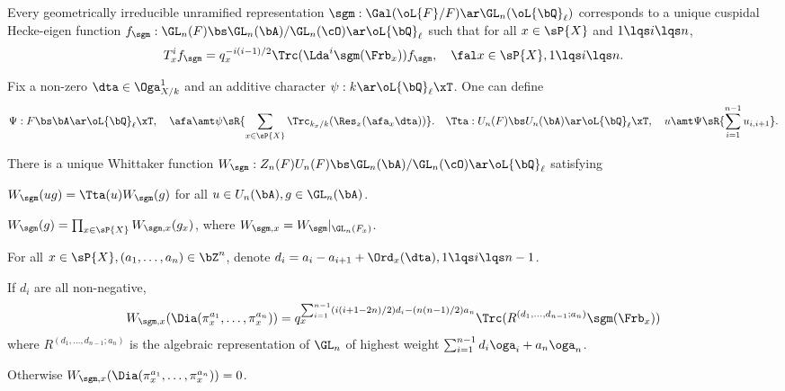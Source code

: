\documentclass[a4paper, twoside]{article}
\begin{document}
\confighead{}{}{}



\begin{cnj}
	Every geometrically irreducible unramified representation $\sgm:\Gal(\oL{F}/F)\ar\GL_{n}(\oL{\bQ}_{\ell})$
	corresponds to a unique cuspidal Hecke-eigen function $f_{\sgm}:\GL_{n}(F)\bs\GL_{n}(\bA)/\GL_{n}(\cO)\ar\oL{\bQ}_{\ell}$ such that for all $x\in\sP{X}$ and $1\lqs i\lqs n$,
	\[
		T_{x}^{i}f_{\sgm}=q_{x}^{-i(i-1)/2}\Trc(\Lda^{i}\sgm(\Frb_{x}))f_{\sgm},\quad \fal x\in\sP{X}, 1\lqs i\lqs n.
	\]
\end{cnj}

\begin{thm}
	Fix a non-zero $\dta\in\Oga_{X/k}^{1}$ and an additive character $\psi:k\ar\oL{\bQ}_{\ell}\xT$. One can define
	\[
		\Psi:F\bs\bA\ar\oL{\bQ}_{\ell}\xT,\quad \afa\amt\psi\sR{\sum_{x\in\sP{X}}\Trc_{k_{x}/k}(\Res_{x}(\afa_{x}\dta))}.\quad \Tta:U_{n}(F)\bs U_{n}(\bA)\ar\oL{\bQ}_{\ell}\xT,\quad u\amt \Psi\sR{\sum_{i=1}^{n-1}u_{i,i+1}}.
	\]

	There is a unique Whittaker function $W_{\sgm}:Z_{n}(F)U_{n}(F)\bs\GL_{n}(\bA)/\GL_{n}(\cO)\ar\oL{\bQ}_{\ell}$ satisfying
	\begin{itm}
		\item $W_{\sgm}(ug)=\Tta(u)W_{\sgm}(g)$ for all $u\in U_{n}(\bA),g\in\GL_{n}(\bA)$.
		\item $W_{\sgm}(g)=\prod_{x\in\sP{X}}W_{\sgm,x}(g_{x})$, where $W_{\sgm,x}=W_{\sgm}|_{\GL_{n}(F_{x})}$.
		\item For all $x\in\sP{X},(a_{1},\ldots,a_{n})\in\bZ^{n}$, denote $d_{i}=a_{i}-a_{i+1}+\Ord_{x}(\dta), 1\lqs i\lqs n-1$.

		If $d_{i}$ are all non-negative,
		\[
			W_{\sgm,x}(\Dia(\pi_{x}^{a_{1}},\ldots,\pi_{x}^{a_{n}}))=q_{x}^{\sum_{i=1}^{n-1}(i(i+1-2n)/2)d_{i}-(n(n-1)/2)a_{n}}\Trc(R^{(d_{1},\ldots,d_{n-1};a_{n})}\sgm(\Frb_{x}))
		\]
		where $R^{(d_{1},\ldots,d_{n-1};a_{n})}$ is the algebraic representation of $\GL_{n}$ of highest weight $\sum_{i=1}^{n-1}d_{i}\oga_{i}+a_{n}\oga_{n}$.

		Otherwise $W_{\sgm,x}(\Dia(\pi_{x}^{a_{1}},\ldots,\pi_{x}^{a_{n}}))=0$.
	\end{itm}
\end{thm}
\end{document}
